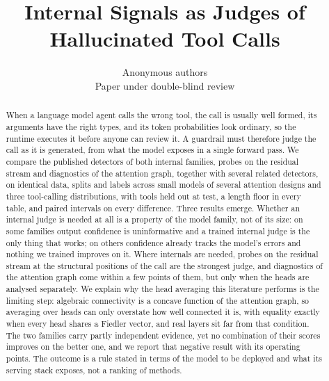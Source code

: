 \documentclass{article}
\title{Internal Signals as Judges of Hallucinated Tool Calls}
\author{Anonymous authors\\Paper under double-blind review}
\date{}
\theoremstyle{definition}
\begin{document}
\maketitle

\begin{abstract}
When a language model agent calls the wrong tool, the call is usually well formed, its arguments have the
right types, and its token probabilities look ordinary, so the runtime executes it before anyone can review
it. A guardrail must therefore judge the call as it is generated, from what the model exposes in a single
forward pass. We compare the published detectors of both internal families, probes on the residual stream
and diagnostics of the attention graph, together with several related detectors, on identical data, splits
and labels across small models of several attention designs and three tool-calling distributions, with
tools held out at test, a length floor in every table, and paired intervals on every difference. Three
results emerge. Whether an internal judge is needed at all is a property of the model family, not of its
size: on some families output confidence is uninformative and a trained internal judge is the only thing
that works; on others confidence already tracks the model's errors and nothing we trained improves on it.
Where internals are needed, probes on the residual stream at the structural positions of the call are the
strongest judge, and diagnostics of the attention graph come within a few points of them, but only when the
heads are analysed separately. We explain why the head averaging this literature performs is the limiting
step: algebraic connectivity is a concave function of the attention graph, so averaging over heads can only
overstate how well connected it is, with equality exactly when every head shares a Fiedler vector, and real
layers sit far from that condition. The two families carry partly independent evidence, yet no combination
of their scores improves on the better one, and we report that negative result with its operating points.
The outcome is a rule stated in terms of the model to be deployed and what its serving stack exposes, not a
ranking of methods.
\end{abstract}








\end{document}
